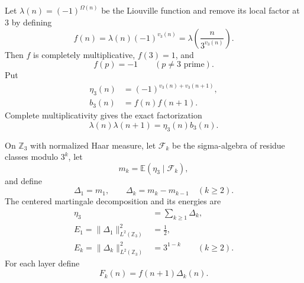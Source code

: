 \documentclass[11pt]{amsart}
\numberwithin{equation}{section}
\theoremstyle{plain}
\theoremstyle{definition}
\theoremstyle{remark}
\begin{document}
Let $\lambda(n)=(-1)^{\Omega(n)}$ be the Liouville function and remove its local factor at $3$ by defining
\begin{equation}
f(n)
=
\lambda(n)(-1)^{v_3(n)}
=
\lambda\!\left(\frac{n}{3^{v_3(n)}}\right).
\label{eq:three_free_liouville_function}
\end{equation}
Then $f$ is completely multiplicative, $f(3)=1$, and
\begin{equation}
f(p)=-1
\qquad(p\neq3\text{ prime}).
\label{eq:three_free_liouville_prime_values}
\end{equation}
Put
\begin{align}
\eta_3(n)
&=
(-1)^{v_3(n)+v_3(n+1)},
\label{eq:triadic_valuation_parity_arithmetic}
\\
b_3(n)
&=
f(n)f(n+1).
\label{eq:triadic_residual_factor_arithmetic}
\end{align}
Complete multiplicativity gives the exact factorization
\begin{equation}
\lambda(n)\lambda(n+1)=\eta_3(n)b_3(n).
\label{eq:adjacent_liouville_triadic_factorization}
\end{equation}

On $\mathbb Z_3$ with normalized Haar measure, let $\mathcal F_k$ be the sigma-algebra of residue classes modulo $3^k$, let
\begin{equation}
m_k=\mathbb E(\eta_3\mid\mathcal F_k),
\label{eq:triadic_conditional_expectation_arithmetic}
\end{equation}
and define
\begin{equation}
\Delta_1=m_1,
\qquad
\Delta_k=m_k-m_{k-1}
\quad(k\geq2).
\label{eq:triadic_shells_arithmetic}
\end{equation}
The centered martingale decomposition and its energies are
\begin{align}
\eta_3
&=
\sum_{k\geq1}\Delta_k,
\label{eq:triadic_shell_decomposition_arithmetic}
\\
E_1=\|\Delta_1\|_{L^2(\mathbb Z_3)}^2
&=
\frac12,
\label{eq:triadic_first_energy_arithmetic}
\\
E_k=\|\Delta_k\|_{L^2(\mathbb Z_3)}^2
&=
3^{1-k}
\qquad(k\geq2).
\label{eq:triadic_higher_energies_arithmetic}
\end{align}
For each layer define
\begin{equation}
F_k(n)=f(n+1)\Delta_k(n).
\label{eq:arithmetic_layer_definition}
\end{equation}
\end{document}
